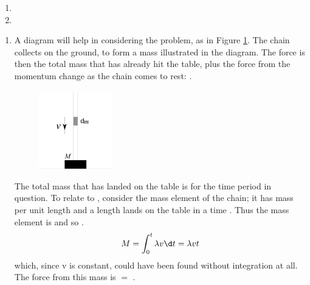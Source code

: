 
\begin{problem}[HE+_Chain] 
{\begin{enumerate}
\item {} 
\item {}
\end{enumerate}
}
{}
{\begin{enumerate}
	\item A diagram will help in considering the problem, as in Figure \ref{fig:Dynamics_falling_chain_force}. The chain collects on the ground, to form a mass  illustrated in the diagram. The force is then the total mass that has already hit the table, plus the force from the momentum change as the chain comes to rest: .

\begin{figure}[h]
	\centering
	\includegraphics[width=0.3\textwidth]{../../../figures/Dynamics_falling_chain_force.svg}
	\caption{}
	\label{fig:Dynamics_falling_chain_force}
\end{figure}

The total mass that has landed on the table is  for the time period in question. To relate  to , consider the mass element of the chain; it has mass per unit length \vari{\lambda} and a length  lands on the table in a time . Thus the mass element is  and so .
\begin{equation*} 
M = \int_{0}^{t}\lambda v \d t = \lambda v t
\end{equation*}
which, since v is constant, could have been found without integration at all. The force from this mass is  $=$ .


\end{enumerate}}
\end{problem}
